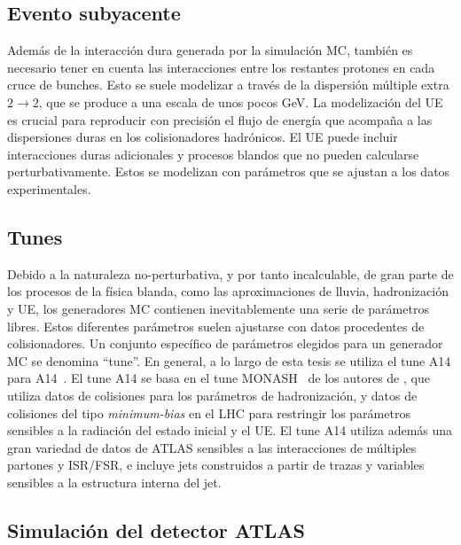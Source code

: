 \subsection{Evento subyacente}

Además de la interacción dura generada por la simulación \ac{MC}, también es necesario tener en cuenta las interacciones entre los restantes protones en cada cruce de bunches. Esto se suele modelizar a través de la dispersión múltiple extra \(2 \to 2\), que se produce a una escala de unos pocos GeV. La modelización del \ac{UE} es crucial para reproducir con precisión el flujo de energía que acompaña a las dispersiones duras en los colisionadores hadrónicos. El \ac{UE} puede incluir interacciones duras adicionales y procesos blandos que no pueden calcularse perturbativamente. Estos se modelizan con parámetros que se ajustan a los datos experimentales.



\subsection{Tunes}

Debido a la naturaleza no-perturbativa, y por tanto incalculable, de gran parte de los procesos de la física blanda, como las aproximaciones de lluvia, hadronización y \ac{UE}, los generadores \ac{MC} contienen inevitablemente una serie de parámetros libres. Estos diferentes parámetros suelen ajustarse con datos procedentes de colisionadores. Un conjunto específico de parámetros elegidos para un generador \ac{MC} se denomina \enquote{tune}.
En general, a lo largo de esta tesis se utiliza el tune A14 para \Pythia A14~\cite{Pythia-A14Tune}.
El tune A14 se basa en el tune MONASH~\cite{MonashTune} de los autores de \Pythia, que utiliza datos de colisiones \ee para los parámetros de hadronización, y datos de colisiones \pp del tipo \textit{minimum-bias} en el \ac{LHC} para restringir los parámetros sensibles a la radiación del estado inicial y el \ac{UE}. El tune A14 utiliza además una gran variedad de datos de \ac{ATLAS} sensibles a las interacciones de múltiples partones y \ac{ISR}/\ac{FSR}, e incluye jets construidos a partir de trazas y variables sensibles a la estructura interna del jet.


\subsection{Simulaci\'on del detector \acs{ATLAS}}

